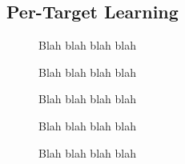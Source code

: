 \documentclass[../main.tex]{subfiles}
\begin{document}
\subsection{Per-Target Learning}

\begin{figure}[H]
    \caption{Blah blah blah blah}\label{fig:behavior}
\end{figure}

\begin{figure}[H]
    \caption{Blah blah blah blah}\label{fig:behavior}
\end{figure}

\begin{figure}[H]
    \caption{Blah blah blah blah}\label{fig:behavior}
\end{figure}

\begin{figure}[H]
    \caption{Blah blah blah blah}\label{fig:behavior}
\end{figure}

\begin{figure}[H]
    \caption{Blah blah blah blah}\label{fig:behavior}
\end{figure}
\end{document}
